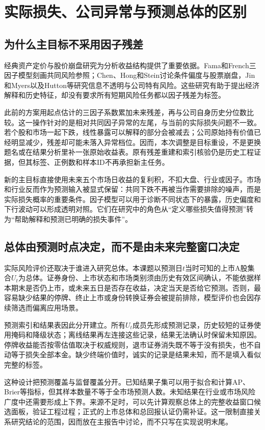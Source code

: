 \section{实际损失、公司异常与预测总体的区别}
\subsection{为什么主目标不采用因子残差}
经典资产定价与股价崩盘研究为分析收益结构提供了重要依据。Fama和French三因子模型刻画共同风险参照\cite{r4}；Chen、Hong和Stein讨论条件偏度与股票崩盘\cite{r1}，Jin和Myers以及Hutton等研究信息不透明与公司特有风险\cite{r2,r3}。这些研究有助于提出经济解释和历史特征，却没有要求所有短期风险任务都以因子残差为标签。

此前的方案用起点估计的三因子系数累加未来残差，再与公司自身历史分位数比较。这一操作针对的是相对共同因子异常的左尾，与当前的实际损失问题不一致。若个股和市场一起下跌，线性暴露可以解释的部分会被减去；公司原始持有价值已经明显减少，残差却可能未落入异常档位。因而，本次调整是目标重设，不是更换题名或在结果分析里补一张原始收益表。原有残差重建和索引核验仍是历史工程证据，但其标签、正例数和样本ID不再承担新主任务。

新的主目标直接使用未来五个市场日收益的复利积，不扣大盘、行业或因子。市场和行业反而作为预测输入被显式保留：共同下跌不再被当作需要排除的噪声，而是实际损失概率的重要条件。因子模型可以用于诊断不同状态下的暴露，历史偏度和下行波动可以形成透明对照。它们在研究中的角色从“定义哪些损失值得预测”转为“帮助解释和预测已明确的损失事件”。

\subsection{总体由预测时点决定，而不是由未来完整窗口决定}
实际风险评价还取决于谁进入研究总体。本课题以预测日$t$当时可知的上市A股集合$U_t$为总体。证券身份、上市状态和市场类别须由历史有效区间确认，不能依据样本期末是否仍上市，或未来五日是否存在收益，决定当天是否给它预测。否则，最容易缺少结果的停牌、终止上市或身份转换证券会被提前排除，模型评价也会因存续筛选而偏离应用场景。

预测索引和结果表因此分开建立。所有$U_t$成员先形成预测记录，历史较短的证券使用掩码和降级状态；离线结果再左连接这些记录，结果无法确认时保留未知原因。停牌收益能否按零估值取决于权威规则，退市证券消失既不等于没有损失，也不自动等于损失全部本金。缺少终端价值时，诚实的记录是结果未知，而不是填入看似完整的标签。

这种设计把预测覆盖与监督覆盖分开。已知结果子集可以用于拟合和计算AP、Brier等指标，但其样本数量不等于全市场预测人数。未知结果在行业或市场风险广度中还需要形成上下界。来源不足时，可以先计算观察总体上的完整收益窗口候选面板，验证工程过程；正式的上市总体和总回报认证仍需补证。这一限制直接关系研究结论的范围，因而放在主报告中讨论，而不只写在实现说明末尾。

